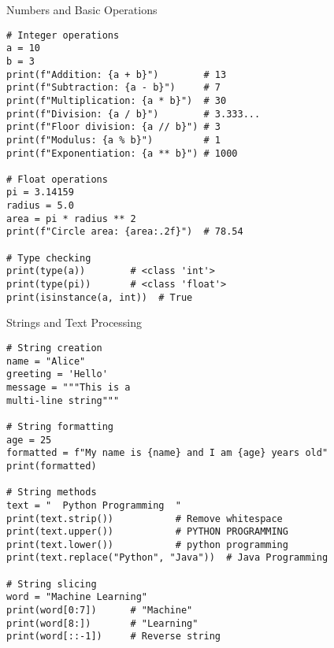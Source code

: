 \begin{frame}[fragile]{Numbers and Basic Operations}
    \begin{codeblock}
        \begin{lstlisting}
# Integer operations
a = 10
b = 3
print(f"Addition: {a + b}")        # 13
print(f"Subtraction: {a - b}")     # 7
print(f"Multiplication: {a * b}")  # 30
print(f"Division: {a / b}")        # 3.333...
print(f"Floor division: {a // b}") # 3
print(f"Modulus: {a % b}")         # 1
print(f"Exponentiation: {a ** b}") # 1000

# Float operations
pi = 3.14159
radius = 5.0
area = pi * radius ** 2
print(f"Circle area: {area:.2f}")  # 78.54

# Type checking
print(type(a))        # <class 'int'>
print(type(pi))       # <class 'float'>
print(isinstance(a, int))  # True
        \end{lstlisting}
    \end{codeblock}
\end{frame}

\begin{frame}[fragile]{Strings and Text Processing}
    \begin{codeblock}
        \begin{lstlisting}
# String creation
name = "Alice"
greeting = 'Hello'
message = """This is a
multi-line string"""

# String formatting
age = 25
formatted = f"My name is {name} and I am {age} years old"
print(formatted)

# String methods
text = "  Python Programming  "
print(text.strip())           # Remove whitespace
print(text.upper())           # PYTHON PROGRAMMING
print(text.lower())           # python programming
print(text.replace("Python", "Java"))  # Java Programming

# String slicing
word = "Machine Learning"
print(word[0:7])      # "Machine"
print(word[8:])       # "Learning"
print(word[::-1])     # Reverse string
        \end{lstlisting}
    \end{codeblock}
\end{frame}

